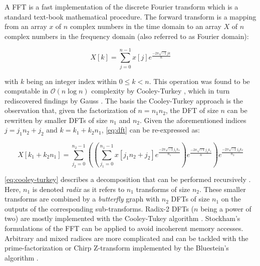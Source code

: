 A FFT is a fast implementation of the discrete Fourier transform which is a standard text-book mathematical procedure. The forward transform is a mapping from an array $x$ of $n$ complex numbers in the time domain to an array $X$ of $n$ complex numbers in the frequency domain (also referred to as Fourier domain):

\begin{equation}
  \label{eq:dft}
  X[k] = \sum_{j=0}^{n-1} x[j]e^{\frac{-2\pi\sqrt{-1}jk}{n}}
\end{equation}

with $k$ being an integer index within $0 \le k < n$. This operation was found to be computable in $\mathcal{O}(n \log n)$ complexity by Cooley-Turkey \cite{cooley1965algorithm}, which in turn rediscovered findings by Gauss \cite{gauss}. The basis the Cooley-Turkey approach is the observation that, given the factorization of $n=n_1n_2$, the  DFT of size $n$ can be rewritten by smaller DFTs of size $n_1$ and $n_2$. Given the aforementioned indices $j=j_1n_2 + j_2$ and $k=k_1+k_2n_1$, \cref{eq:dft} can be re-expressed as:

\begin{equation}
  \label{eq:cooley-turkey}
  X[k_1 + k_2n_1] = \sum_{j_2=0}^{n_2-1} \left( \left( \sum_{j_1=0}^{n_1-1} x[j_1n_2 + j_2] e^{\frac{-2\pi\sqrt{-1}j_1k_1}{n_1}} \right) e^{\frac{-2\pi\sqrt{-1}j_2k_1}{n}} \right) e^{\frac{-2\pi\sqrt{-1}j_2k_2}{n_2}}
\end{equation}

\cref{eq:cooley-turkey} describes a decomposition that can be performed recursively \cite{FFTW05}. Here, $n_1$ is denoted \emph{radix} as it refers to $n_1$ transforms of size $n_2$. These smaller transforms are combined by a \emph{butterfly} graph with $n_2$ DFTs of size $n_1$ on the outputs of the corresponding sub-transforms. Radix-2 DFTs ($n$ being a power of two) are mostly implemented with the Cooley-Tukey algorithm \cite{cooley1965algorithm}. Stockham's formulations of the FFT can be applied \cite{stockham1966high} to avoid incoherent memory accesses. Arbitrary and mixed radices are more complicated and can be tackled with the prime-factorization or Chirp Z-transform implemented by the Bluestein's algorithm \cite{bluestein}. 

